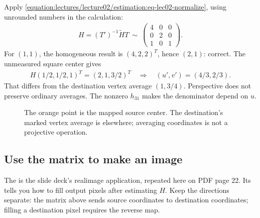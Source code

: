 \documentclass[letterpaper,11pt,english,openany,oneside]{jupyterBook}
\begin{document}
\begin{TextbookBox}
\sphinxAtStartPar
{} Apply \eqref{equation:lectures/lecture02/estimation:eq-lec02-normalize}, using unrounded numbers in the calculation:
\begin{equation*}
\begin{split}
H=(T')^{-1}\widetilde H T
\ \sim\ \begin{pmatrix}4&0&0\\0&2&0\\1&0&1\end{pmatrix}.
\end{split}
\end{equation*}
\sphinxAtStartPar
{} For \((1,1)\), the homogeneous result is \((4,2,2)^T\), hence \((2,1)\): correct. The unmeasured square center gives
\begin{equation*}
\begin{split}
H(1/2,1/2,1)^T=(2,1,3/2)^T
\quad\Rightarrow\quad (u',v')=(4/3,2/3).
\end{split}
\end{equation*}
\sphinxAtStartPar
That differs from the destination vertex average \((1,3/4)\). Perspective does not preserve ordinary averages. The nonzero \(h_{31}\) makes the denominator depend on \(u\).

\end{TextbookBox}

\begin{figure}[H]
\centering
\capstart

\noindent{}
\caption{The orange point is the mapped source center. The destination’s marked vertex average is elsewhere; averaging coordinates is not a projective operation.}\label{\detokenize{lectures/lecture03/homography-practice:fig-lec03-dlt}}\end{figure}


\subsection{Use the matrix to make an image}
\label{\detokenize{lectures/lecture03/homography-practice:use-the-matrix-to-make-an-image}}
\sphinxAtStartPar
The {\hyperref[\detokenize{lectures/lecture02/homographies::doc}]{}} is the slide deck’s real\sphinxhyphen{}image application, repeated here on PDF page 22. Its {\hyperref[\detokenize{lectures/lecture02/warping::doc}]{}} tells you how to fill output pixels after estimating \(H\). Keep the directions separate: the matrix above sends source coordinates to destination coordinates; filling a destination pixel requires the reverse map.
\end{document}
